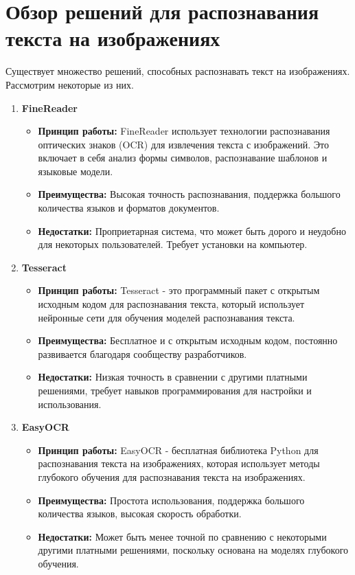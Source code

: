 \documentclass[12pt]{report}
\begin{document}
\section{Обзор решений для распознавания текста на изображениях}
Существует множество решений, способных распознавать текст на изображениях. Рассмотрим некоторые из них. 
\begin{enumerate}
    \item \textbf{FineReader} \cite{bib:finereader}
        \begin{itemize}
            \item \textbf{Принцип работы:} FineReader использует технологии распознавания оптических знаков (OCR) для извлечения текста с изображений. Это включает в себя анализ формы символов, распознавание шаблонов и языковые модели.
            \item \textbf{Преимущества:} Высокая точность распознавания, поддержка большого количества языков и форматов документов.
            \item \textbf{Недостатки:} Проприетарная система, что может быть дорого и неудобно для некоторых пользователей. Требует установки на компьютер.
        \end{itemize}
    
    \item \textbf{Tesseract} \cite{bib:tesseract}
        \begin{itemize}
            \item \textbf{Принцип работы:} Tesseract - это программный пакет с открытым исходным кодом для распознавания текста, который использует нейронные сети для обучения моделей распознавания текста.
            \item \textbf{Преимущества:} Бесплатное и с открытым исходным кодом, постоянно развивается благодаря сообществу разработчиков.
            \item \textbf{Недостатки:} Низкая точность в сравнении с другими платными решениями, требует навыков программирования для настройки и использования.
        \end{itemize}
    
    \item \textbf{EasyOCR} \cite{bib:easyocr}
        \begin{itemize}
            \item \textbf{Принцип работы:} EasyOCR - бесплатная библиотека Python для распознавания текста на изображениях, которая использует методы глубокого обучения для распознавания текста на изображениях.
            \item \textbf{Преимущества:} Простота использования, поддержка большого количества языков, высокая скорость обработки.
            \item \textbf{Недостатки:} Может быть менее точной по сравнению с некоторыми другими платными решениями, поскольку основана на моделях глубокого обучения.
        \end{itemize}
\end{enumerate}
\end{document}
